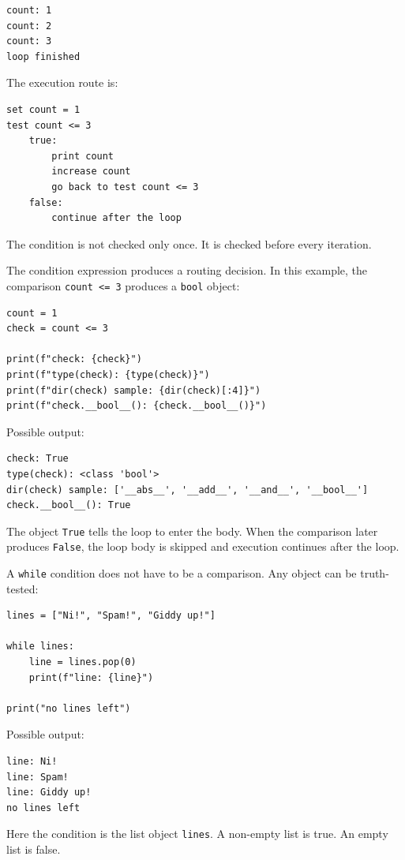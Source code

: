 \begin{verbatim}
count: 1
count: 2
count: 3
loop finished
\end{verbatim}

The execution route is:

\begin{verbatim}
set count = 1
test count <= 3
    true:
        print count
        increase count
        go back to test count <= 3
    false:
        continue after the loop
\end{verbatim}

The condition is not checked only once. It is checked before every iteration.

The condition expression produces a routing decision. In this example, the comparison \texttt{count <= 3} produces a \texttt{bool} object:

\begin{verbatim}
count = 1
check = count <= 3

print(f"check: {check}")
print(f"type(check): {type(check)}")
print(f"dir(check) sample: {dir(check)[:4]}")
print(f"check.__bool__(): {check.__bool__()}")
\end{verbatim}

Possible output:

\begin{verbatim}
check: True
type(check): <class 'bool'>
dir(check) sample: ['__abs__', '__add__', '__and__', '__bool__']
check.__bool__(): True
\end{verbatim}

The object \texttt{True} tells the loop to enter the body. When the comparison later produces \texttt{False}, the loop body is skipped and execution continues after the loop.

A \texttt{while} condition does not have to be a comparison. Any object can be truth-tested:

\begin{verbatim}
lines = ["Ni!", "Spam!", "Giddy up!"]

while lines:
    line = lines.pop(0)
    print(f"line: {line}")

print("no lines left")
\end{verbatim}

Possible output:

\begin{verbatim}
line: Ni!
line: Spam!
line: Giddy up!
no lines left
\end{verbatim}

Here the condition is the list object \texttt{lines}. A non-empty list is true. An empty list is false.

